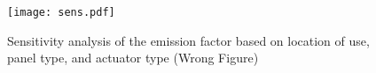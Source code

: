 \begin{figure}[H]
\begin{center}
\texttt{[image: sens.pdf]}
\caption{Sensitivity analysis of the emission factor based on location of use, panel type, and actuator type (Wrong Figure)}
\label{fig:sens}
\end{center}
\end{figure}









